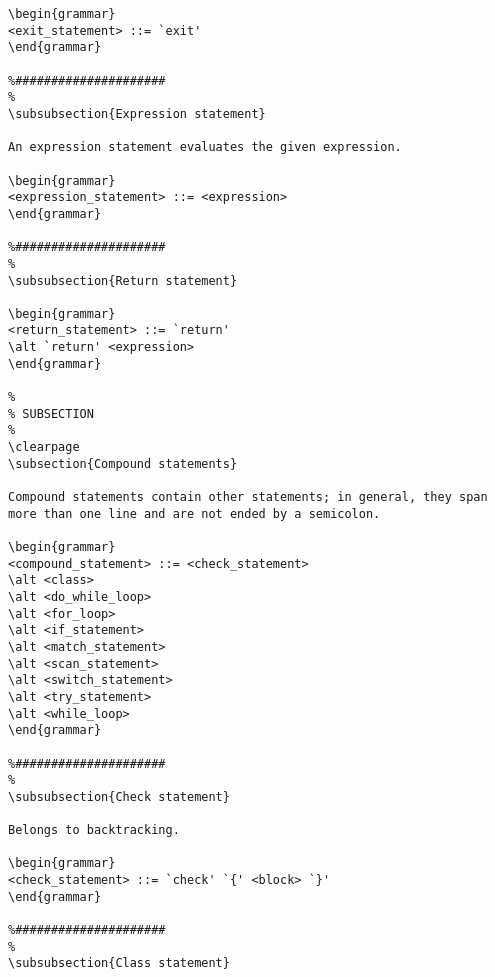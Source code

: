 \begin{verbatim}
\begin{grammar}
<exit_statement> ::= `exit'
\end{grammar}

%#####################
%
\subsubsection{Expression statement}

An expression statement evaluates the given expression.

\begin{grammar}
<expression_statement> ::= <expression>
\end{grammar}

%#####################
%
\subsubsection{Return statement}

\begin{grammar}
<return_statement> ::= `return'
\alt `return' <expression>
\end{grammar}

%
% SUBSECTION
%
\clearpage
\subsection{Compound statements}

Compound statements contain other statements; in general, they span more than one line and are not ended by a semicolon.

\begin{grammar}
<compound_statement> ::= <check_statement>
\alt <class>
\alt <do_while_loop>
\alt <for_loop>
\alt <if_statement>
\alt <match_statement>
\alt <scan_statement>
\alt <switch_statement>
\alt <try_statement>
\alt <while_loop>
\end{grammar}

%#####################
%
\subsubsection{Check statement}

Belongs to backtracking.

\begin{grammar}
<check_statement> ::= `check' `{' <block> `}'
\end{grammar}

%#####################
%
\subsubsection{Class statement}


\end{verbatim}
